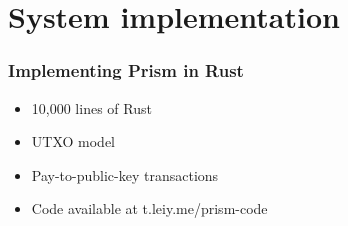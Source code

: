 \documentclass[svgnames]{beamer}
\begin{document}
\section{System implementation}

\begin{frame}
\end{frame}

\begin{frame}
    \frametitle{Implementing Prism in Rust}
    \begin{itemize}
        \item 10,000 lines of Rust
        \item UTXO model
        \item Pay-to-public-key transactions
        \item Code available at t.leiy.me/prism-code
    \end{itemize}
\end{frame}
\end{document}

